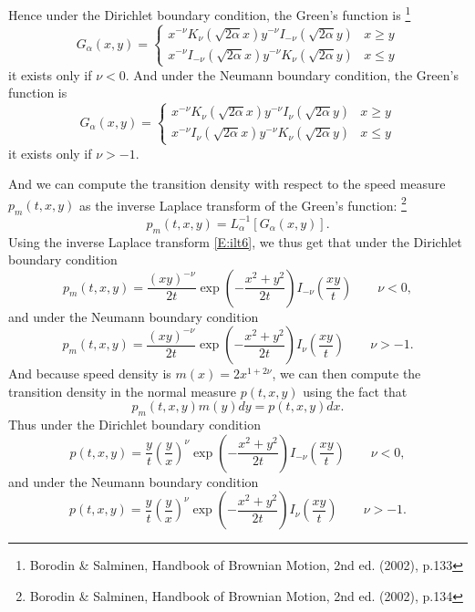 Hence under the Dirichlet boundary condition, the Green's function is
\footnote{Borodin \& Salminen, Handbook of Brownian Motion, 2nd ed. (2002), 
    p.133}
\begin{equation}
  G_{\alpha}(x,y) = 
    \begin{cases}
      x^{-\nu} K_{\nu}(\sqrt{2\alpha} x) y^{-\nu} I_{-\nu}(\sqrt{2\alpha}y)
        & x\ge y  \\
      x^{-\nu} I_{-\nu}(\sqrt{2\alpha}x) y^{-\nu} K_{\nu}(\sqrt{2\alpha} y) 
        & x\le y
    \end{cases}
\end{equation}
it exists only if $\nu<0$. And under the Neumann boundary condition, the Green's
function is
\begin{equation}
  G_{\alpha}(x,y) = 
    \begin{cases}
      x^{-\nu} K_{\nu}(\sqrt{2\alpha} x) y^{-\nu} I_{\nu}(\sqrt{2\alpha}y)
        & x\ge y  \\
      x^{-\nu} I_{\nu}(\sqrt{2\alpha}x) y^{-\nu} K_{\nu}(\sqrt{2\alpha} y) 
        & x\le y
    \end{cases}
\end{equation}
it exists only if $\nu>-1$. 

And we can compute the transition density with respect to the speed measure
$p_m(t,x,y)$ as the inverse Laplace transform of the Green's function:
\footnote{Borodin \& Salminen, Handbook of Brownian Motion, 2nd ed. (2002), 
    p.134}
\[
  p_m(t,x,y) = L_{\alpha}^{-1}[G_{\alpha}(x,y)].
\]
Using the inverse Laplace transform \ref{E:ilt6}, we thus get that under the
Dirichlet boundary condition
\begin{equation}
  p_m(t,x,y) = \frac{(xy)^{-\nu}}{2t} \exp\left( -\frac{x^2+y^2}{2t} \right)
      I_{-\nu} \left( \frac{xy}{t} \right) \qquad \nu<0,
\end{equation}
and under the Neumann boundary condition
\begin{equation}
  p_m(t,x,y) = \frac{(xy)^{-\nu}}{2t} \exp\left( -\frac{x^2+y^2}{2t} \right)
      I_{\nu} \left( \frac{xy}{t} \right) \qquad \nu>-1.
\end{equation}
And because speed density is $m(x)=2x^{1+2\nu}$, we can then compute
the transition density in the normal measure $p(t,x,y)$ using the fact that
\[
  p_m(t,x,y) m(y) dy = p(t,x,y) dx.
\]
Thus under the Dirichlet boundary condition
\begin{equation}
  p(t,x,y) = \frac{y}{t} \left( \frac{y}{x} \right)^{\nu} 
     \exp\left( -\frac{x^2+y^2}{2t} \right)
    I_{-\nu} \left( \frac{xy}{t} \right) \qquad \nu<0,
\end{equation}
and under the Neumann boundary condition
\begin{equation}
  p(t,x,y) = \frac{y}{t} \left( \frac{y}{x} \right)^{\nu} 
     \exp\left( -\frac{x^2+y^2}{2t} \right)
      I_{\nu} \left( \frac{xy}{t} \right) \qquad \nu>-1.
\end{equation}


